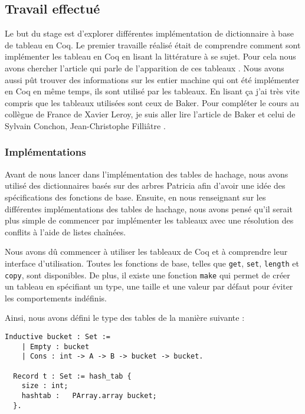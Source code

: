 \documentclass{article}
\begin{document}
    \newpage
    \subsection{Travail effectué}

  Le but du stage est d'explorer différentes implémentation de dictionnaire à
base de tableau en Coq. Le premier travaille réalisé était de comprendre
comment sont implémenter les tableau en Coq en lisant la littérature à se sujet.
Pour cela nous avons chercher l'article qui parle de l'apparition de ces tableaux
\cite{armand2010extending}. Nous avons aussi pût trouver des informations sur les
entier machine qui ont été implémenter en Coq en même temps, ils sont
utilisé par les tableaux. En lisant ça j'ai très vite compris que les tableaux
utilisées sont ceux de Baker. Pour compléter le cours au collègue de France de
Xavier Leroy, je suis aller lire l'article de Baker \cite{baker1991shallow} et
celui de Sylvain Conchon, Jean-Christophe Filliâtre \cite{conchon2007persistent}.

    \subsubsection{Implémentations}

  Avant de nous lancer dans l'implémentation des tables de hachage, nous avons
utilisé des dictionnaires basés sur des arbres Patricia afin d'avoir une idée
des spécifications des fonctions de base. Ensuite, en nous renseignant sur les
différentes implémentations des tables de hachage, nous avons pensé qu'il serait
plus simple de commencer par implémenter les tableaux avec une résolution des
conflits à l'aide de listes chaînées.

  Nous avons dû commencer à utiliser les tableaux de Coq et à comprendre leur
interface d'utilisation. Toutes les fonctions de base, telles que
\texttt{get}, \texttt{set}, \texttt{length} et \texttt{copy}, sont disponibles.
De plus, il existe une fonction \texttt{make} qui permet de créer un tableau en
spécifiant un type, une taille et une valeur par défaut pour éviter les
comportements indéfinis.

Ainsi, nous avons défini le type des tables de la manière suivante :

\begin{lstlisting}[language=Coq]
  Inductive bucket : Set :=
    | Empty : bucket
    | Cons : int -> A -> B -> bucket -> bucket.

  Record t : Set := hash_tab {
    size : int;
    hashtab :   PArray.array bucket;
  }.
\end{lstlisting}
\end{document}
